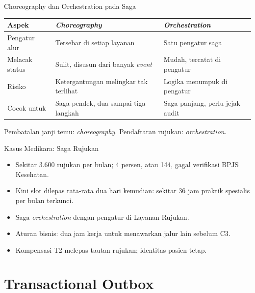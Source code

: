 \documentclass[aspectratio=169, table, 12pt]{beamer}
\begin{document}
\begin{frame}{{\Large Choreography dan Orchestration pada Saga}}
  \footnotesize
  \begin{tabularx}{\textwidth}{>{\raggedright\arraybackslash}p{3.2cm}
      >{\raggedright\arraybackslash}X >{\raggedright\arraybackslash}X}
    \hline
    \textbf{Aspek} & \textbf{\textit{Choreography}} &
      \textbf{\textit{Orchestration}} \\
    \hline
    Pengatur alur & Tersebar di setiap layanan & Satu pengatur saga \\
    \hline
    Melacak status & Sulit, disusun dari banyak \textit{event} & Mudah,
      tercatat di pengatur \\
    \hline
    Risiko & Ketergantungan melingkar tak terlihat & Logika menumpuk di
      pengatur \\
    \hline
    Cocok untuk & Saga pendek, dua sampai tiga langkah & Saga panjang, perlu
      jejak audit \\
    \hline
  \end{tabularx}

  \vspace{8pt}
  \small
  Pembatalan janji temu: \textit{choreography}. Pendaftaran rujukan:
  \textit{orchestration}.
\end{frame}

\begin{frame}{{\Large Kasus Medikara: Saga Rujukan}}
  \vspace{6pt}
  \small
  \begin{itemize}
    \item Sekitar 3.600 rujukan per bulan; 4 persen, atau 144, gagal verifikasi
          BPJS Kesehatan.
    \item Kini slot dilepas rata-rata dua hari kemudian: sekitar 36 jam praktik
          spesialis per bulan terkunci.
    \item Saga \textit{orchestration} dengan pengatur di Layanan Rujukan.
    \item Aturan bisnis: dua jam kerja untuk menawarkan jalur lain sebelum C3.
    \item Kompensasi T2 melepas tautan rujukan; identitas pasien tetap.
  \end{itemize}
\end{frame}

\section{Transactional Outbox}
\end{document}
